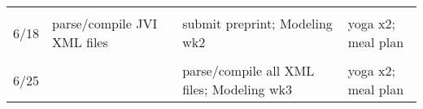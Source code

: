 \documentclass[]{article}
\begin{document}
\begin{longtable}[]{@{}clll@{}}
\begin{minipage}[t]{0.04\columnwidth}
\end{minipage} & \begin{minipage}[t]{0.24\columnwidth}\raggedright\strut
\strut
\end{minipage} & \begin{minipage}[t]{0.33\columnwidth}\raggedright\strut
\strut
\end{minipage} & \begin{minipage}[t]{0.28\columnwidth}\raggedright\strut
\strut
\end{minipage}\tabularnewline
\begin{minipage}[t]{0.04\columnwidth}\centering\strut
6/18\strut
\end{minipage} & \begin{minipage}[t]{0.24\columnwidth}\raggedright\strut
parse/compile JVI XML files\strut
\end{minipage} & \begin{minipage}[t]{0.33\columnwidth}\raggedright\strut
submit preprint; Modeling wk2\strut
\end{minipage} & \begin{minipage}[t]{0.28\columnwidth}\raggedright\strut
yoga x2; meal plan\strut
\end{minipage}\tabularnewline
\begin{minipage}[t]{0.04\columnwidth}\centering\strut
\strut
\end{minipage} & \begin{minipage}[t]{0.24\columnwidth}\raggedright\strut
\strut
\end{minipage} & \begin{minipage}[t]{0.33\columnwidth}\raggedright\strut
\strut
\end{minipage} & \begin{minipage}[t]{0.28\columnwidth}\raggedright\strut
\strut
\end{minipage}\tabularnewline
\begin{minipage}[t]{0.04\columnwidth}\centering\strut
6/25\strut
\end{minipage} & \begin{minipage}[t]{0.24\columnwidth}\raggedright\strut
\strut
\end{minipage} & \begin{minipage}[t]{0.33\columnwidth}\raggedright\strut
parse/compile all XML files; Modeling wk3\strut
\end{minipage} & \begin{minipage}[t]{0.28\columnwidth}\raggedright\strut
yoga x2; meal plan\strut
\end{minipage}\tabularnewline

\end{longtable}
\end{document}
